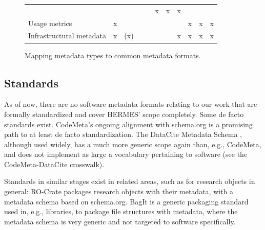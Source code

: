 \documentclass{article}
\begin{document}
\begin{figure}
\begin{tabular}{lllllllllll}
& 

& 

& 

& 

& x

& x

& x

\\
Usage metrics

& x

& 

& 

& 

& 

& 

& 

& x

& x

& x

\\
Infrastructural metadata

& x

& (x)

& 

& 

& 

& 

& x

& x

& x

& x

\\
\end{tabular}
\caption{Mapping metadata types to common metadata formats.}
\label{y2o46dfd3ike}
\end{figure}

\subsection{Standards}\label{subsec:metadata-standards}
As of now, there are no software metadata formats relating to our work that are formally standardized and cover HERMES’ scope completely. Some de facto standards exist. CodeMeta’s ongoing alignment with schema.org is a promising path to at least de facto standardization. The DataCite Metadata Schema \cite{138880/AJSS9RWC}, although used widely, has a much more generic scope again than, e.g., CodeMeta, and does not implement as large a vocabulary pertaining to software (see the CodeMeta-DataCite crosswalk).

Standards in similar stages exist in related areas, such as for research objects in general: RO-Crate \cite{138880/S5F3HZ96} packages research objects with their metadata, with a metadata schema based on schema.org. BagIt \cite{138880/CE9VUDMM} is a generic packaging standard used in, e.g., libraries, to package file structures with metadata, where the metadata schema is very generic and not targeted to software specifically.
\end{document}
